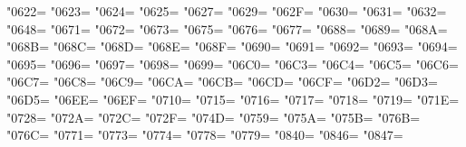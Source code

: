 \XeTeXcharclass"0622=\KclassArabR
\XeTeXcharclass"0623=\KclassArabR
\XeTeXcharclass"0624=\KclassArabR
\XeTeXcharclass"0625=\KclassArabR
\XeTeXcharclass"0627=\KclassArabR
\XeTeXcharclass"0629=\KclassArabR
\XeTeXcharclass"062F=\KclassArabR
\XeTeXcharclass"0630=\KclassArabR
\XeTeXcharclass"0631=\KclassArabR
\XeTeXcharclass"0632=\KclassArabR
\XeTeXcharclass"0648=\KclassArabR
\XeTeXcharclass"0671=\KclassArabR
\XeTeXcharclass"0672=\KclassArabR
\XeTeXcharclass"0673=\KclassArabR
\XeTeXcharclass"0675=\KclassArabR
\XeTeXcharclass"0676=\KclassArabR
\XeTeXcharclass"0677=\KclassArabR
\XeTeXcharclass"0688=\KclassArabR
\XeTeXcharclass"0689=\KclassArabR
\XeTeXcharclass"068A=\KclassArabR
\XeTeXcharclass"068B=\KclassArabR
\XeTeXcharclass"068C=\KclassArabR
\XeTeXcharclass"068D=\KclassArabR
\XeTeXcharclass"068E=\KclassArabR
\XeTeXcharclass"068F=\KclassArabR
\XeTeXcharclass"0690=\KclassArabR
\XeTeXcharclass"0691=\KclassArabR
\XeTeXcharclass"0692=\KclassArabR
\XeTeXcharclass"0693=\KclassArabR
\XeTeXcharclass"0694=\KclassArabR
\XeTeXcharclass"0695=\KclassArabR
\XeTeXcharclass"0696=\KclassArabR
\XeTeXcharclass"0697=\KclassArabR
\XeTeXcharclass"0698=\KclassArabR
\XeTeXcharclass"0699=\KclassArabR
\XeTeXcharclass"06C0=\KclassArabR
\XeTeXcharclass"06C3=\KclassArabR
\XeTeXcharclass"06C4=\KclassArabR
\XeTeXcharclass"06C5=\KclassArabR
\XeTeXcharclass"06C6=\KclassArabR
\XeTeXcharclass"06C7=\KclassArabR
\XeTeXcharclass"06C8=\KclassArabR
\XeTeXcharclass"06C9=\KclassArabR
\XeTeXcharclass"06CA=\KclassArabR
\XeTeXcharclass"06CB=\KclassArabR
\XeTeXcharclass"06CD=\KclassArabR
\XeTeXcharclass"06CF=\KclassArabR
\XeTeXcharclass"06D2=\KclassArabR
\XeTeXcharclass"06D3=\KclassArabR
\XeTeXcharclass"06D5=\KclassArabR
\XeTeXcharclass"06EE=\KclassArabR
\XeTeXcharclass"06EF=\KclassArabR
\XeTeXcharclass"0710=\KclassArabR
\XeTeXcharclass"0715=\KclassArabR
\XeTeXcharclass"0716=\KclassArabR
\XeTeXcharclass"0717=\KclassArabR
\XeTeXcharclass"0718=\KclassArabR
\XeTeXcharclass"0719=\KclassArabR
\XeTeXcharclass"071E=\KclassArabR
\XeTeXcharclass"0728=\KclassArabR
\XeTeXcharclass"072A=\KclassArabR
\XeTeXcharclass"072C=\KclassArabR
\XeTeXcharclass"072F=\KclassArabR
\XeTeXcharclass"074D=\KclassArabR
\XeTeXcharclass"0759=\KclassArabR
\XeTeXcharclass"075A=\KclassArabR
\XeTeXcharclass"075B=\KclassArabR
\XeTeXcharclass"076B=\KclassArabR
\XeTeXcharclass"076C=\KclassArabR
\XeTeXcharclass"0771=\KclassArabR
\XeTeXcharclass"0773=\KclassArabR
\XeTeXcharclass"0774=\KclassArabR
\XeTeXcharclass"0778=\KclassArabR
\XeTeXcharclass"0779=\KclassArabR
\XeTeXcharclass"0840=\KclassArabR
\XeTeXcharclass"0846=\KclassArabR
\XeTeXcharclass"0847=\KclassArabR
